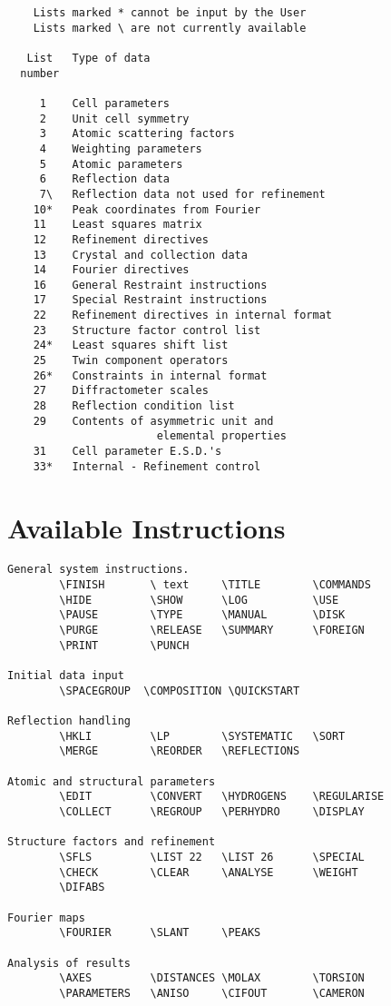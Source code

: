 \documentclass[10pt,a4paper]{report}
\begin{document}
\small\begin{verbatim}
    Lists marked * cannot be input by the User
    Lists marked \ are not currently available

   List   Type of data
  number

     1    Cell parameters
     2    Unit cell symmetry
     3    Atomic scattering factors
     4    Weighting parameters
     5    Atomic parameters
     6    Reflection data
     7\   Reflection data not used for refinement
    10*   Peak coordinates from Fourier
    11    Least squares matrix
    12    Refinement directives
    13    Crystal and collection data
    14    Fourier directives
    16    General Restraint instructions
    17    Special Restraint instructions
    22    Refinement directives in internal format
    23    Structure factor control list
    24*   Least squares shift list
    25    Twin component operators
    26*   Constraints in internal format
    27    Diffractometer scales
    28    Reflection condition list
    29    Contents of asymmetric unit and
                       elemental properties
    31    Cell parameter E.S.D.'s
    33*   Internal - Refinement control
\end{verbatim}\normalsize





\section{Available Instructions}

\small\begin{verbatim}
General system instructions.
        \FINISH       \ text     \TITLE        \COMMANDS
        \HIDE         \SHOW      \LOG          \USE
        \PAUSE        \TYPE      \MANUAL       \DISK
        \PURGE        \RELEASE   \SUMMARY      \FOREIGN
        \PRINT        \PUNCH

Initial data input
        \SPACEGROUP  \COMPOSITION \QUICKSTART

Reflection handling
        \HKLI         \LP        \SYSTEMATIC   \SORT
        \MERGE        \REORDER   \REFLECTIONS

Atomic and structural parameters
        \EDIT         \CONVERT   \HYDROGENS    \REGULARISE
        \COLLECT      \REGROUP   \PERHYDRO     \DISPLAY

Structure factors and refinement
        \SFLS         \LIST 22   \LIST 26      \SPECIAL
        \CHECK        \CLEAR     \ANALYSE      \WEIGHT
        \DIFABS

Fourier maps
        \FOURIER      \SLANT     \PEAKS

Analysis of results
        \AXES         \DISTANCES \MOLAX        \TORSION
        \PARAMETERS   \ANISO     \CIFOUT       \CAMERON
\end{verbatim}\normalsize
\end{document}
